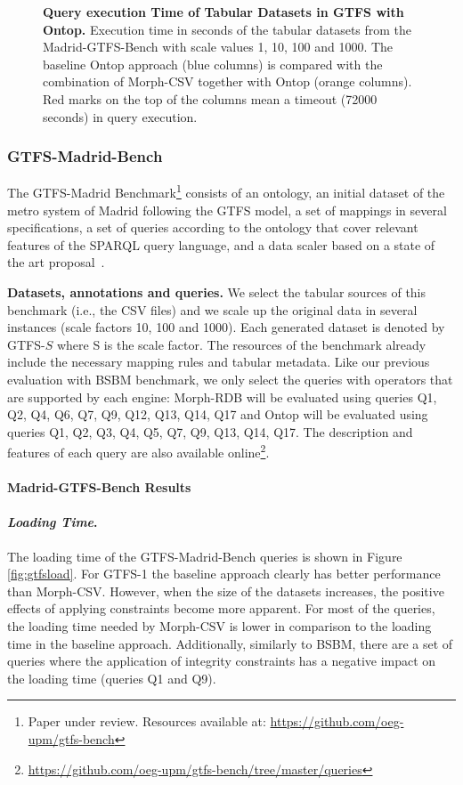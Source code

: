 \begin{figure}[th]
{  \label{fig:ontop1000}
  }
\caption[Query execution Time in GTFS with Ontop]{\textbf{Query execution Time of Tabular Datasets in GTFS with Ontop.} Execution time in seconds of the tabular datasets from the Madrid-GTFS-Bench with scale values 1, 10, 100 and 1000. The baseline Ontop approach (blue columns) is compared with the combination of Morph-CSV together with Ontop (orange columns). 
Red marks on the top of the columns mean a timeout (72000 seconds) in query execution.}
\label{fig:ontopgtfs}
\end{figure}



\subsubsection{GTFS-Madrid-Bench}
The GTFS-Madrid Benchmark\footnote{Paper under review. Resources available at: \url{https://github.com/oeg-upm/gtfs-bench}} consists of an ontology, an initial dataset of the metro system of Madrid following the GTFS model, a set of mappings in several specifications, a set of queries according to the ontology that cover relevant features of the SPARQL query language, and a data scaler based on a state of the art proposal~\cite{lanti2015npd}. 

\noindent\textbf{Datasets, annotations and queries.} We select the tabular sources of this benchmark (i.e., the CSV files) and we scale up the original data in several instances (scale factors 10, 100 and 1000). Each generated dataset is denoted by GTFS-$S$ where S is the scale factor. The resources of the benchmark already include the necessary mapping rules and tabular metadata. Like our previous evaluation with BSBM benchmark, we only select the queries with operators that are supported by each engine: Morph-RDB will be evaluated using  queries Q1, Q2, Q4, Q6, Q7, Q9, Q12, Q13, Q14, Q17 and Ontop will be evaluated using  queries Q1, Q2, Q3, Q4, Q5, Q7, Q9, Q13, Q14, Q17. The description and features of each query are also available online\footnote{\url{https://github.com/oeg-upm/gtfs-bench/tree/master/queries}}.

\noindent\paragraph*{\textbf{Madrid-GTFS-Bench Results}}

\noindent\paragraph*{\textit{Loading Time}.}
The loading time of the GTFS-Madrid-Bench queries is shown in Figure \ref{fig:gtfsload}. For GTFS-1 the baseline approach clearly has better performance than Morph-CSV. However, when the size of the datasets increases, the positive effects of applying constraints become more apparent. For most of the queries, the loading time needed by Morph-CSV is lower in comparison to the loading time in the baseline approach. Additionally, similarly to BSBM, there are a set of queries where the application of integrity constraints has a negative impact on the loading time (queries Q1 and Q9).

